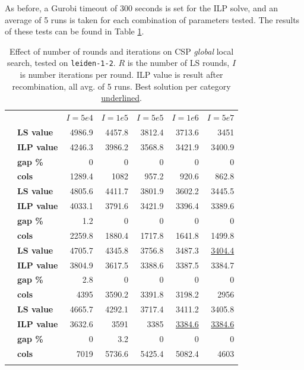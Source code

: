 \documentclass[]{article}
\begin{document}
As before, a Gurobi timeout of 300 seconds is set for the ILP solve, and an average of 5 runs is taken for each combination of parameters tested. The results of these tests can be found in Table \ref{tab:csp-ls-global}.

\begin{table}[h]
  \centering
  \begin{tabular}{llrrrrr}
    \toprule
    && $I=5e4$ & $I=1e5$ & $I=5e5$ & $I=1e6$ & $I=5e7$  \\
    \arrayrulecolor{black!30}\cmidrule(lr){1-7}
    \addlinespace[0.4em]
    \multirow{4}{*}{$R=100$} & \textbf{LS value}  & 4986.9 & 4457.8 & 3812.4 & 3713.6 & 3451 \\
    & \textbf{ILP value}   & 4246.3 & 3986.2 & 3568.8 & 3421.9 & 3400.9 \\
    & \textbf{gap \%} & 0 & 0 & 0 & 0 & 0 \\
    & \textbf{cols} & 1289.4 & 1082 & 957.2 & 920.6 & 862.8 \\
    \arrayrulecolor{black!30}\cmidrule(lr){1-7}
    \multirow{4}{*}{$R=200$} & \textbf{LS value}  & 4805.6 & 4411.7 & 3801.9 & 3602.2 & 3445.5 \\
    & \textbf{ILP value}   & 4033.1 & 3791.6 & 3421.9 & 3396.4 & 3389.6 \\
    & \textbf{gap \%} & 1.2 & 0 & 0 & 0 & 0 \\
    & \textbf{cols} & 2259.8 & 1880.4 & 1717.8 & 1641.8 & 1499.8 \\
    \arrayrulecolor{black!30}\cmidrule(lr){1-7}
    \multirow{4}{*}{$R=500$} & \textbf{LS value}  & 4705.7 & 4345.8 & 3756.8 & 3487.3 & \underline{3404.4} \\
    & \textbf{ILP value}   & 3804.9 & 3617.5 & 3388.6 & 3387.5 & 3384.7 \\
    & \textbf{gap \%} & 2.8 & 0 & 0 & 0 & 0 \\
    & \textbf{cols} & 4395 & 3590.2 & 3391.8 & 3198.2 & 2956 \\
    \arrayrulecolor{black!30}\cmidrule(lr){1-7}
    \multirow{4}{*}{$R=1000$} & \textbf{LS value}  & 4665.7 & 4292.1 & 3717.4 & 3411.2 & 3405.8 \\
    & \textbf{ILP value}   & 3632.6 & 3591 & 3385 & \underline{3384.6} & \underline{3384.6} \\
    & \textbf{gap \%} & 0 & 3.2 & 0 & 0 & 0 \\
    & \textbf{cols} & 7019 & 5736.6 & 5425.4 & 5082.4 & 4603 \\
    \arrayrulecolor{black}\bottomrule
  \end{tabular}
  \caption{Effect of number of rounds and iterations on CSP \textit{global} local search, tested on \texttt{leiden-1-2}. $R$ is the number of LS rounds, $I$ is number iterations per round. ILP value is result after recombination, all avg. of 5 runs. Best solution per category \underline{underlined}.}
  \label{tab:csp-ls-global}
\end{table}
\end{document}
